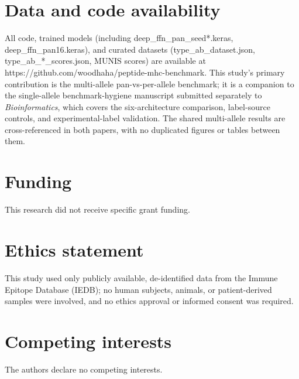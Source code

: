 \documentclass[10pt]{article}
\begin{document}
\section*{Data and code availability}
All code, trained models (including deep\_ffn\_pan\_seed*.keras, deep\_ffn\_pan16.keras), and curated datasets (type\_ab\_dataset.json, type\_ab\_*\_scores.json, MUNIS scores) are available at https://github.com/woodhaha/peptide-mhc-benchmark. This study's primary contribution is the multi-allele pan-vs-per-allele benchmark; it is a companion to the single-allele benchmark-hygiene manuscript submitted separately to \textit{Bioinformatics}, which covers the six-architecture comparison, label-source controls, and experimental-label validation. The shared multi-allele results are cross-referenced in both papers, with no duplicated figures or tables between them.

\section*{Funding}
This research did not receive specific grant funding.

\section*{Ethics statement}
This study used only publicly available, de-identified data from the Immune Epitope Database (IEDB); no human subjects, animals, or patient-derived samples were involved, and no ethics approval or informed consent was required.

\section*{Competing interests}
The authors declare no competing interests.



\end{document}
